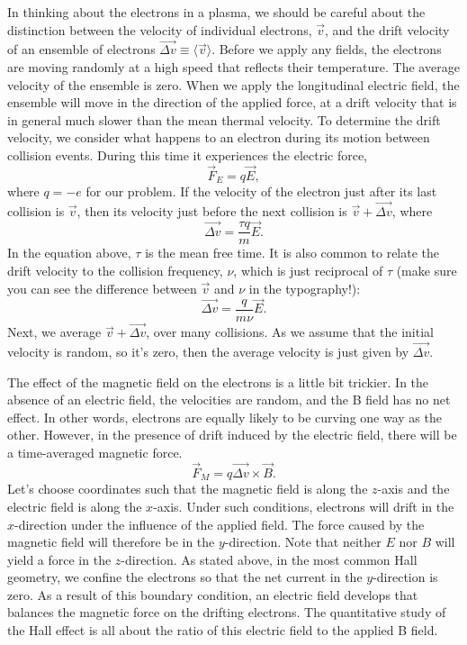 \documentclass{../lab}
\begin{document}
In thinking about the electrons in a plasma, we should be careful about the distinction between the velocity of individual electrons, $\vec{v}$, and the drift velocity of an ensemble of electrons $\overrightarrow{\Delta v} \equiv \langle\vec{v}\rangle$. Before we apply any fields, the electrons are moving randomly at a high speed that reflects their temperature. The average velocity of the ensemble is zero. When we apply the longitudinal electric field, the ensemble will move in the direction of the applied force, at a drift velocity that is in general much slower than the mean thermal velocity. To determine the drift velocity, we consider what happens to an electron during its motion between collision events. During this time it experiences the electric force,
\begin{equation}
    \vec{F}_E = q \vec{E},
\end{equation}
where $q = -e$ for our problem. If the velocity of the electron just after its last collision is $\vec{v}$, then its velocity just before the next collision is $\vec{v} + \overrightarrow{\Delta v}$, where
\begin{equation}
    \overrightarrow{\Delta v} = \frac{\tau q}{m}\vec{E}.
\end{equation}
In the equation above, $ \tau$ is the mean free time. It is also common to relate the drift velocity to the collision frequency, $ \nu$, which is just reciprocal of $ \tau$ (make sure you can see the difference between $\vec{v}$ and $\nu$ in the typography!):
\begin{equation}
    \overrightarrow{\Delta v} = \frac{q}{m \nu}\vec{E}.
\end{equation}
Next, we average $ \vec{v} + \overrightarrow{\Delta v}$, over many collisions. As we assume that the initial velocity is random, so it's zero, then the average velocity is just given by $ \overrightarrow{\Delta v}$.

The effect of the magnetic field on the electrons is a little bit trickier. In the absence of an electric field, the velocities are random, and the B field has no net effect. In other words, electrons are equally likely to be curving one way as the other. However, in the presence of drift induced by the electric field, there will be a time-averaged magnetic force.
\begin{equation}
    \vec{F}_{M} = q \overrightarrow{\Delta v} \times \vec{B}.
\end{equation}
Let's choose coordinates such that the magnetic field is along the $z$-axis and the electric field is along the $x$-axis. Under such conditions, electrons will drift in the $x$-direction under the influence of the applied field. The force caused by the magnetic field will therefore be in the $y$-direction. Note that neither $E$ nor $B$ will yield a force in the $z$-direction. As stated above, in the most common Hall geometry, we confine the electrons so that the net current in the $y$-direction is zero. As a result of this boundary condition, an electric field develops that balances the magnetic force on the drifting electrons. The quantitative study of the Hall effect is all about the ratio of this electric field to the applied B field.
\end{document}
